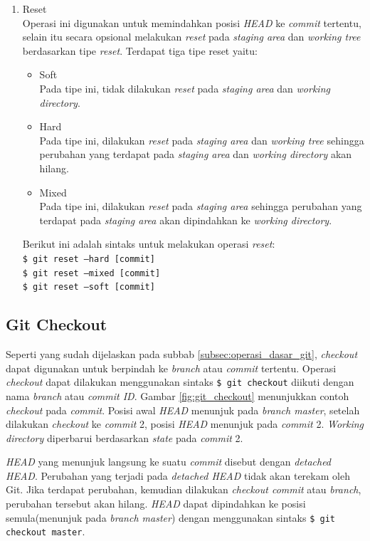 \begin{enumerate}
\item Reset\\
Operasi ini digunakan untuk memindahkan posisi \textit{HEAD} ke \textit{commit} tertentu, selain itu secara opsional  melakukan \textit{reset} pada \textit{staging area} dan \textit{working tree} berdasarkan tipe \textit{reset}. Terdapat tiga tipe reset yaitu:
\begin{itemize}
\item Soft\\
Pada tipe ini, tidak dilakukan \textit{reset} pada \textit{staging area} dan \textit{working directory}.
\item Hard\\
Pada tipe ini, dilakukan \textit{reset} pada \textit{staging area} dan \textit{working tree} sehingga perubahan yang terdapat pada \textit{staging area} dan \textit{working directory} akan hilang.
\item Mixed\\
Pada tipe ini, dilakukan \textit{reset} pada \textit{staging area} sehingga perubahan yang terdapat pada \textit{staging area} akan dipindahkan ke \textit{working directory}.  
\end{itemize} 

Berikut ini adalah sintaks untuk melakukan operasi \textit{reset}:\\
\texttt{\$ git reset --hard [commit]}\\
\texttt{\$ git reset --mixed [commit]}\\
\texttt{\$ git reset --soft [commit]}
\end{enumerate}
\subsection{Git Checkout}
\label{subsec:git_checkout}
Seperti yang sudah dijelaskan pada subbab \ref{subsec:operasi_dasar_git}, \textit{checkout} dapat digunakan untuk berpindah ke \textit{branch} atau \textit{commit} tertentu. Operasi \textit{checkout} dapat dilakukan menggunakan sintaks \texttt{\$ git checkout} diikuti dengan nama \textit{branch} atau \textit{commit ID}. Gambar \ref{fig:git_checkout} menunjukkan contoh \textit{checkout} pada \textit{commit}. Posisi awal \textit{HEAD} menunjuk pada \textit{branch master}, setelah dilakukan \textit{checkout} ke \textit{commit} 2, posisi \textit{HEAD} menunjuk pada \textit{commit} 2. \textit{Working directory} diperbarui berdasarkan \textit{state} pada \textit{commit} 2. 

\textit{HEAD} yang menunjuk langsung ke suatu \textit{commit} disebut dengan \textit{detached HEAD}. Perubahan yang terjadi pada \textit{detached HEAD} tidak akan terekam oleh Git. Jika terdapat perubahan, kemudian dilakukan \textit{checkout commit} atau \textit{branch}, perubahan tersebut akan hilang. \textit{HEAD} dapat dipindahkan ke posisi semula(menunjuk pada \textit{branch master}) dengan  menggunakan sintaks \texttt{\$ git checkout master}.


